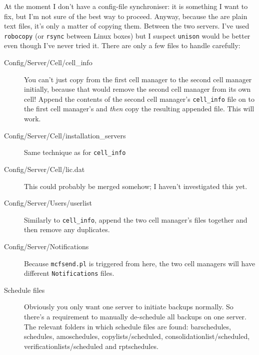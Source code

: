 \documentclass{article}
\begin{document}
At the moment I don't have a config-file synchroniser: it is something I want to fix, but I'm not sure of the best way to proceed. Anyway, because the are plain text files, it's only a matter
of copying them. Between the two servers. I've used {\tt robocopy} (or {\tt rsync} between Linux boxes) but I suspect {\tt unison} would be better even though I've never tried it. There are only a few files to handle carefully:
\begin{description}
\item[Config/Server/Cell/cell\_info] You can't just copy from the first cell manager to the second cell manager initially, because that would remove the second cell manager from its own cell! Append the contents of the second cell manager's {\tt cell\_info} file on to the first cell manager's and {\it then} copy the resulting appended file. This will work.
\item[Config/Server/Cell/installation\_servers] Same technique as for {\tt cell\_info}
\item[Config/Server/Cell/lic.dat] This could probably be merged somehow; I haven't investigated this yet.
\item[Config/Server/Users/userlist] Similarly to {\tt cell\_info}, append the two cell manager's files together and then remove any duplicates.
\item[Config/Server/Notifications] Because {\tt mcfsend.pl} is triggered from here, the two cell managers will have different {\tt Notifications} files.
\item[Schedule files] Obviously you only want one server to initiate backups normally. So there's a requirement to manually de-schedule all backups on one server. The
relevant folders in which schedule files are found: barschedules, schedules, amoschedules, copylists/scheduled, consolidationlist/scheduled, verificationlists/scheduled and rptschedules. 
\end{description}
\end{document}
